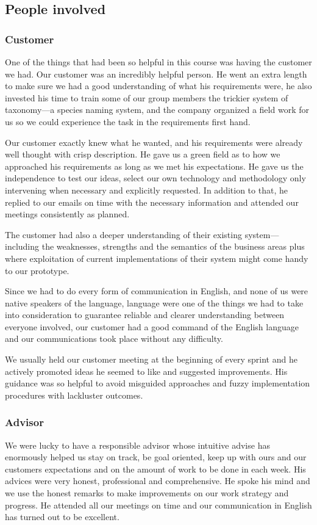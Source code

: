 \subsection{People involved}
	\subsubsection{Customer}
One of the things that had been so helpful in this course was having the customer we had. Our customer was an incredibly helpful person. He went an extra length to make sure we had a good understanding of what his requirements were, he also invested his time to train some of our group members the trickier system of taxonomy---a species naming system, and the company organized a field work for us so we could experience the task in the requirements first hand.

Our customer exactly knew what he wanted, and his requirements were already well thought with crisp description. He gave us a green field as to how we approached his requirements as long as we met his expectations. He gave us the independence to test our ideas, select our own technology and methodology only intervening when necessary and explicitly requested. In addition to that, he replied to our emails on time with the necessary information and attended our meetings consistently as planned.

The customer had also a deeper understanding of their existing system---including the weaknesses, strengths and the semantics of the business areas plus where exploitation of current implementations of their system might come handy to our prototype.

Since we had to do every form of communication in English, and none of us were native speakers of the language, language were one of the things we had to take into consideration to guarantee reliable and clearer understanding between everyone involved, our customer had a good command of the English language and our communications took place without any difficulty.

We usually held our customer meeting at the beginning of every sprint and he actively promoted ideas he seemed to like and suggested improvements.  His guidance was so helpful to avoid misguided approaches and fuzzy implementation procedures with lackluster outcomes.

	\subsubsection{Advisor}
We were lucky to have a responsible advisor whose intuitive advise has enormously helped us stay on track, be goal oriented, keep up with ours and our customers expectations and on the amount of work to be done in each week. His advices were very honest, professional and comprehensive. He spoke his mind and we use the honest remarks to make improvements on our work strategy and progress. He attended all our meetings on time and our communication in English has turned out to be excellent.


